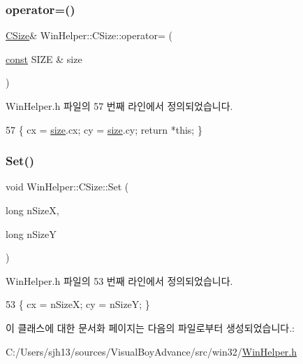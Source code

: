 \subsubsection{\texorpdfstring{operator=()}{operator=()}}
{\footnotesize\ttfamily \mbox{\hyperlink{class_win_helper_1_1_c_size}{C\+Size}}\& Win\+Helper\+::\+C\+Size\+::operator= (\begin{DoxyParamCaption}\item[{\mbox{\hyperlink{getopt1_8c_a2c212835823e3c54a8ab6d95c652660e}{const}} S\+I\+ZE \&}]{size }\end{DoxyParamCaption})\hspace{0.3cm}{\ttfamily [inline]}}



Win\+Helper.\+h 파일의 57 번째 라인에서 정의되었습니다.


\begin{DoxyCode}
57 \{ cx = \mbox{\hyperlink{expr-lex_8cpp_ab7d671599a7b25ca99a487fa341bc33a}{size}}.cx; cy = \mbox{\hyperlink{expr-lex_8cpp_ab7d671599a7b25ca99a487fa341bc33a}{size}}.cy; \textcolor{keywordflow}{return} *\textcolor{keyword}{this}; \}
\end{DoxyCode}
\mbox{\label{class_win_helper_1_1_c_size_a05bf66bfb3fdc5d19da8630983640e5c}} 
\subsubsection{\texorpdfstring{Set()}{Set()}}
{\footnotesize\ttfamily void Win\+Helper\+::\+C\+Size\+::\+Set (\begin{DoxyParamCaption}\item[{long}]{n\+SizeX,  }\item[{long}]{n\+SizeY }\end{DoxyParamCaption})\hspace{0.3cm}{\ttfamily [inline]}}



Win\+Helper.\+h 파일의 53 번째 라인에서 정의되었습니다.


\begin{DoxyCode}
53 \{ cx = nSizeX; cy = nSizeY; \}
\end{DoxyCode}


이 클래스에 대한 문서화 페이지는 다음의 파일로부터 생성되었습니다.\+:\begin{DoxyCompactItemize}
\item 
C\+:/\+Users/sjh13/sources/\+Visual\+Boy\+Advance/src/win32/\mbox{\hyperlink{_win_helper_8h}{Win\+Helper.\+h}}\end{DoxyCompactItemize}
